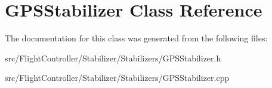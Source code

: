 \hypertarget{classGPSStabilizer}{}\section{G\+P\+S\+Stabilizer Class Reference}
\label{classGPSStabilizer}


The documentation for this class was generated from the following files\+:\begin{DoxyCompactItemize}
\item 
src/\+Flight\+Controller/\+Stabilizer/\+Stabilizers/G\+P\+S\+Stabilizer.\+h\item 
src/\+Flight\+Controller/\+Stabilizer/\+Stabilizers/G\+P\+S\+Stabilizer.\+cpp\end{DoxyCompactItemize}
